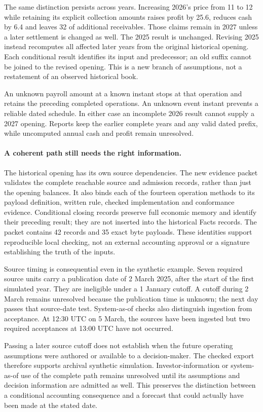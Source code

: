 The same distinction persists across years. Increasing 2026's price from 11
to 12 while retaining its explicit collection amounts raises profit by 25.6,
reduces cash by 6.4 and leaves 32 of additional receivables. Those claims remain
in 2027 unless a later settlement is changed as well. The 2025 result is
unchanged. Revising 2025 instead recomputes all affected later years from the
original historical opening. Each conditional result identifies its input and
predecessor; an old suffix cannot be joined to the revised opening. This is a
new branch of assumptions, not a restatement of an observed historical book.

An unknown payroll amount at a known instant stops at that operation and retains
the preceding completed operations. An unknown event instant prevents a reliable
dated schedule. In either case an incomplete 2026 result cannot supply a 2027
opening. Reports keep the earlier complete years and any valid dated prefix,
while uncomputed annual cash and profit remain unresolved.

\paragraph{A coherent path still needs the right information.}
The historical opening has its own source dependencies. The new evidence packet
validates the complete reachable source and admission records, rather than just
the opening balances. It also binds each of the fourteen operation methods to
its payload definition, written rule, checked implementation and conformance
evidence. Conditional closing records preserve full economic memory and identify
their preceding result; they are not inserted into the historical Facts records.
The packet contains 42 records and 35 exact byte payloads. These identities
support reproducible local checking, not an external accounting approval or a
signature establishing the truth of the inputs.

Source timing is consequential even in the synthetic example. Seven required
source units carry a publication date of 2 March 2025, after the start of the
first simulated year. They are ineligible under a 1 January cutoff. A cutoff
during 2 March remains unresolved because the publication time is unknown;
the next day passes that source-date test. System-as-of checks also distinguish
ingestion from acceptance. At 12:30 UTC on 5 March, the sources have been
ingested but two required acceptances at 13:00 UTC have not occurred.

Passing a later source cutoff does not establish when the future operating
assumptions were authored or available to a decision-maker. The checked export
therefore supports archival synthetic simulation. Investor-information or
system-as-of use of the complete path remains unresolved until its assumptions
and decision information are admitted as well. This preserves the distinction
between a conditional accounting consequence and a forecast that could actually
have been made at the stated date.

